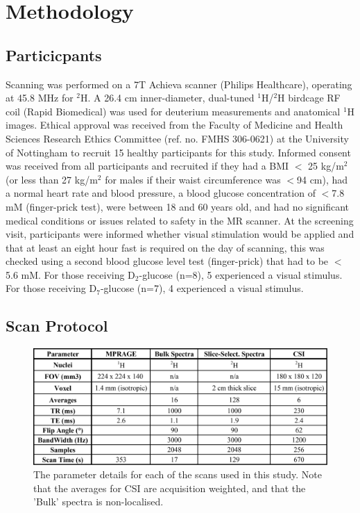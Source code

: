 \documentclass[class=article, crop=false]{standalone}
\begin{document}
\section{Methodology}

\subsection{Particicpants}

Scanning was performed on a 7T Achieva scanner (Philips Healthcare), operating at 45.8 MHz for $^2$H. A 26.4 cm inner-diameter, dual-tuned $^1$H/$^2$H birdcage RF coil (Rapid Biomedical) was used for deuterium measurements and anatomical $^1$H images. Ethical approval was received from the Faculty of Medicine and Health Sciences Research Ethics Committee (ref. no. FMHS 306-0621) at the University of Nottingham to recruit 15 healthy participants for this study. Informed consent was received from all participants and recruited if they had a BMI $<$ 25 kg/m$^2$ (or less than 27 kg/m$^2$ for males if their waist circumference was $<$94 cm), had a normal heart rate and blood pressure, a blood glucose concentration of $<$7.8 mM (finger-prick test), were between 18 and 60 years old, and had no significant medical conditions or issues related to safety in the MR scanner. At the screening visit, participants were informed whether visual stimulation would be applied and that at least an eight hour fast is required on the day of scanning, this was checked using a second blood glucose level test (finger-prick) that had to be $<$5.6 mM. For those receiving D$_2$-glucose (n=8), 5 experienced a visual stimulus. For those receiving D$_7$-glucose (n=7), 4 experienced a visual stimulus.

\subsection{Scan Protocol}

\begin{figure}
    \centering
    \includegraphics[width = 1\textwidth]{Figures/Glucose/Scan_Details.png}
    \caption{The parameter details for each of the scans used in this study. Note that the averages for CSI are acquisition weighted, and that the 'Bulk' spectra is non-localised. }
    \label{fig:Glu:Scan_Details}
\end{figure}
\end{document}
